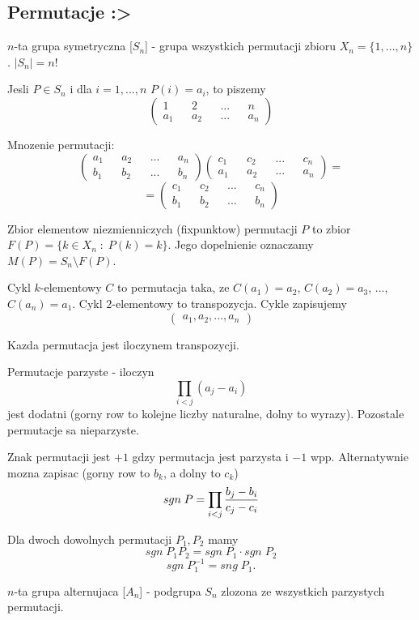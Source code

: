 \subsection{Permutacje :>}
\begin{multicols}{2}
    
    {\color{def}$n$-ta grupa symetryczna} [$S_n$] - grupa wszystkich permutacji zbioru $X_n = \{1, ..., n\}$. $|S_n|=n!$\medskip

    Jesli $P\in S_n$ i dla $i=1,...,n$ $P(i)=a_i$, to piszemy
    $$
        \begin{pmatrix}
            1   && 2   && ... && n  \\
            a_1 && a_2 && ... && a_n
        \end{pmatrix}
    $$

    Mnozenie permutacji:
    $$
        \begin{pmatrix}
            a_1 && a_2 && ... && a_n \\
            b_1 && b_2 && ... && b_n
        \end{pmatrix}
        \begin{pmatrix}
            c_1 && c_2 && ... && c_n \\
            a_1 && a_2 && ... && a_n
        \end{pmatrix} =
    $$
    $$=
    \begin{pmatrix}
        c_1 && c_2 && ... && c_n \\
        b_1 && b_2 && ... && b_n
    \end{pmatrix}
    $$

    {\color{def}Zbior elementow niezmienniczych} (fixpunktow) permutacji $P$ to zbior $F(P)=\{k\in X_n\;:\;P(k)=k\}$. Jego dopelnienie oznaczamy $M(P)=S_n\setminus F(P)$.\medskip

    \medskip

    {\color{def}Cykl $k$-elementowy} $C$ to permutacja taka, ze $C(a_1)=a_2$, $C(a_2)=a_3$, ..., $C(a_n)=a_1$. Cykl $2$-elementowy to {\color{acc}transpozycja}. Cykle zapisujemy
    $$\begin{pmatrix}a_1, a_2,..., a_n\end{pmatrix}$$

    Kazda permutacja jest iloczynem transpozycji.\medskip

    \medskip

    {\color{def}Permutacje parzyste} - iloczyn 
    $$\prod _{i<j}(a_j-a_i)$$ 
    jest dodatni (gorny row to kolejne liczby naturalne, dolny to wyrazy). Pozostale permutacje sa {\color{def}nieparzyste}.\medskip

    {\color{def}Znak permutacji} jest $+1$ gdzy permutacja jest parzysta i $-1$ wpp. Alternatywnie mozna zapisac (gorny row to $b_k$, a dolny to $c_k$)
    $$sgn\;P=\prod_{i<j}{b_j-b_i\over c_j-c_i}$$

    Dla dwoch dowolnych permutacji $P_1,P_2$ mamy
    $$sgn\;P_1P_2=sgn\;P_1\cdot sgn\;P_2$$
    $$sgn\;P_1^{-1}=sng\;P_1.$$

    {\color{def}$n$-ta grupa alternujaca} [$A_n$] - podgrupa $S_n$ zlozona ze wszystkich parzystych permutacji.
 
\end{multicols}\bigskip

